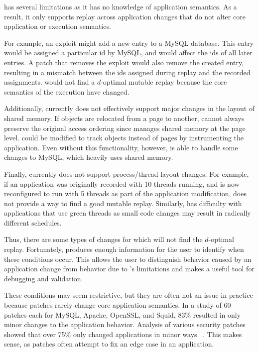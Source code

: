 {\dora} has several limitations as it has no knowledge of application
semantics.  As a result, it only supports replay across application changes
that do not alter core application or execution semantics.

For example, an exploit might add a new entry to a MySQL database. This entry
would be assigned a particular id by MySQL, and would affect the ids of all
later entries. A patch that removes the exploit would also remove the created
entry, resulting in a mismatch between the ids assigned during replay and the recorded assignments. {\dora} would not find a
$d$-optimal mutable replay because the core semantics of the execution have
changed.

Additionally, {\dora} currently does not effectively support major changes in the
layout of shared memory. If objects are relocated from a page to another, {\dora} cannot always
preserve the original access ordering since {\dora} manages
shared memory at the page level. {\dora} could be modified to track
objects instead of pages by instrumenting the application.
Even without this functionality, however, {\dora} is able to handle
some changes to MySQL, which heavily uses shared memory.

Finally, {\dora} currently does not support process/thread layout changes. For
example, if an application was originally recorded with 10 threads running, and
is now reconfigured to run with 5 threads as part of the application
modification, {\dora} does not provide a way to find a good mutable replay.
Similarly, {\dora} has difficulty with applications that use green
threads as small code changes may result in radically different
schedules.

Thus, there are some types of changes for which {\dora} will not find the
$d$-optimal replay.  Fortunately, {\dora} produces enough information for the
user to identify when these conditions occur. This allows the user to
distinguish behavior caused by an application change from behavior due to
{\dora}'s limitations and makes {\dora} a useful tool for debugging and
validation.

These conditions may seem restrictive, but they are often not an issue in
practice because patches rarely change core
application semantics. In a study of 60 patches each for MySQL, Apache, OpenSSL,
and Squid, 83\% resulted in only minor changes to the application behavior.
Analysis of various security patches showed that over 75\% only
changed applications in minor ways ~\cite{mreplay-feas}. This makes sense, as
patches often attempt to fix an edge case in an application.
